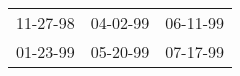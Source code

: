 \begin{supertabular}{p{0.33\columnwidth}p{0.33\columnwidth}p{0.33\columnwidth}}
 11-27-98\textsuperscript{} &  04-02-99\textsuperscript{} &  06-11-99\textsuperscript{} \\
 01-23-99\textsuperscript{} &  05-20-99\textsuperscript{} &  07-17-99\textsuperscript{} \\
\end{supertabular}
